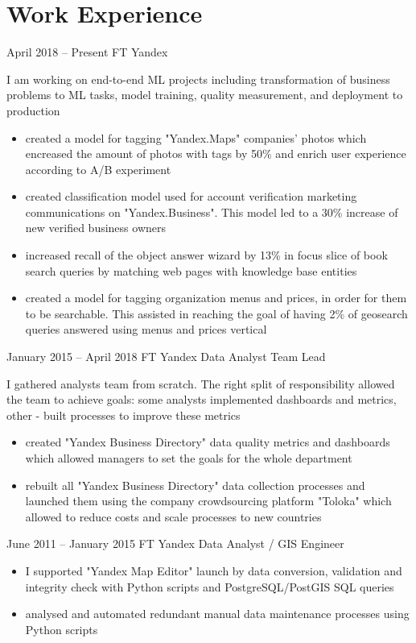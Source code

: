 \section{Work Experience}

\jobentry
    {April 2018 -- Present}
    {FT}
    {Yandex}
    {\currentPosition}
    {
        I am working on end-to-end ML projects including transformation of business problems to ML tasks, model training, quality measurement, and deployment to production
        \begin{itemize}
            \item created a model for tagging "Yandex.Maps" companies' photos which encreased the amount of photos with tags by 50\% and enrich user experience according to A/B experiment
            \item created classification model used for account verification marketing communications on "Yandex.Business". This model led to a 30\% increase of new verified business owners
            \item increased recall of the object answer wizard by 13\% in focus slice of book search queries by matching web pages with knowledge base entities
            \item created a model for tagging organization menus and prices, in order for them to be searchable. This assisted in reaching the goal of having 2\% of geosearch queries answered using menus and prices vertical
        \end{itemize}
    }

\hrulefill

\jobentry
    {January 2015 -- April 2018}
    {FT}
    {Yandex}
    {Data Analyst Team Lead}
    {
        I gathered analysts team from scratch. The right split of responsibility allowed the team to achieve goals: some analysts implemented dashboards and metrics, other - built processes to improve these metrics
        \begin{itemize}
            \item created "Yandex Business Directory" data quality metrics and dashboards which allowed managers to set the goals for the whole department
            \item rebuilt all "Yandex Business Directory" data collection processes and launched them using the company crowdsourcing platform "Toloka" which allowed to reduce costs and scale processes to new countries
        \end{itemize}
    }

\hrulefill

\jobentry
    {June 2011 -- January 2015}
    {FT}
    {Yandex}
    {Data Analyst / GIS Engineer}
    {
        \begin{itemize}[topsep=0pt]
            \item I supported "Yandex Map Editor" launch by data conversion, validation and integrity check with Python scripts and PostgreSQL/PostGIS SQL queries
            \item analysed and automated redundant manual data maintenance processes using Python scripts
        \end{itemize}
    }
